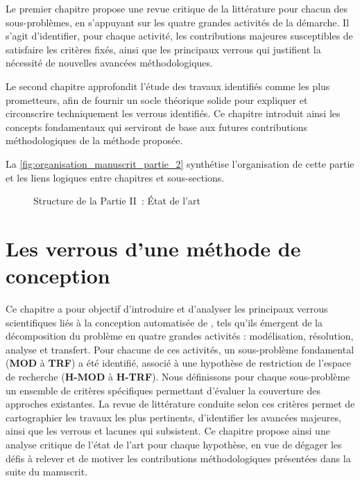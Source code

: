 Le premier chapitre propose une revue critique de la littérature pour chacun des sous-problèmes, en s'appuyant sur les quatre grandes activités de la démarche. Il s'agit d'identifier, pour chaque activité, les contributions majeures susceptibles de satisfaire les critères fixés, ainsi que les principaux verrous qui justifient la nécessité de nouvelles avancées méthodologiques.

Le second chapitre approfondit l'étude des travaux identifiés comme les plus prometteurs, afin de fournir un socle théorique solide pour expliquer et circonscrire techniquement les verrous identifiés. Ce chapitre introduit ainsi les concepts fondamentaux qui serviront de base aux futures contributions méthodologiques de la méthode proposée.

La \autoref{fig:organisation_manuscrit_partie_2} synthétise l'organisation de cette partie et les liens logiques entre chapitres et sous-sections.


\begin{figure}[h!]
  \centering
  \resizebox{0.8\textwidth}{!}{%
    
  }
  \caption{Structure de la Partie II~: État de l'art}
  \label{fig:organisation_manuscrit_partie_2}
\end{figure}

\clearpage
\thispagestyle{empty}
\null
\newpage


\chapter{Les verrous d'une méthode de conception}
\label{chap:verrous}

\noindent
Ce chapitre a pour objectif d'introduire et d'analyser les principaux verrous scientifiques liés à la conception automatisée de , tels qu'ils émergent de la décomposition du problème en quatre grandes activités : modélisation, résolution, analyse et transfert. Pour chacune de ces activités, un sous-problème fondamental (\textbf{MOD} à \textbf{TRF}) a été identifié, associé à une hypothèse de restriction de l'espace de recherche (\textbf{H-MOD} à \textbf{H-TRF}). Nous définissons pour chaque sous-problème un ensemble de critères spécifiques permettant d'évaluer la couverture des approches existantes. La revue de littérature conduite selon ces critères permet de cartographier les travaux les plus pertinents, d'identifier les avancées majeures, ainsi que les verrous et lacunes qui subsistent. Ce chapitre propose ainsi une analyse critique de l'état de l'art pour chaque hypothèse, en vue de dégager les défis à relever et de motiver les contributions méthodologiques présentées dans la suite du manuscrit.

